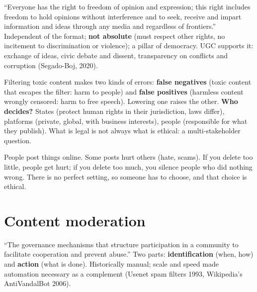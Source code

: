 \documentclass[11pt,a4paper,openany]{book}
\begin{document}
\begin{defnbox}[title={Freedom of expression (UDHR art.\ 19, 1948; ICCPR, 1966)}]
``Everyone has the right to freedom of opinion and expression; this right includes freedom to
hold opinions without interference and to seek, receive and impart information and ideas through
any media and regardless of frontiers.'' Independent of the format; \textbf{not absolute}
(must respect other rights, no incitement to discrimination or violence); a pillar of democracy.
UGC supports it: exchange of ideas, civic debate and dissent, transparency on conflicts and
corruption (Segado-Boj, 2020).
\end{defnbox}

\begin{keybox}[title={The dilemma: free speech vs.\ toxic content}]
Filtering toxic content makes two kinds of errors:
\textbf{false negatives} (toxic content that escapes the filter: harm to people) and
\textbf{false positives} (harmless content wrongly censored: harm to free speech). Lowering one
raises the other. \textbf{Who decides?} States (protect human rights in their jurisdiction,
laws differ), platforms (private, global, with business interests), people (responsible for
what they publish). What is legal is not always what is ethical: a multi-stakeholder question.
\end{keybox}

\begin{goatbox}
People post things online. Some posts hurt others (hate, scams). If you delete too little,
people get hurt; if you delete too much, you silence people who did nothing wrong. There is no
perfect setting, so someone has to choose, and that choice is ethical.
\end{goatbox}


\section{Content moderation}

\begin{defnbox}[title={Content moderation (Grimmelmann, 2015)}]
``The governance mechanisms that structure participation in a community to facilitate
cooperation and prevent abuse.'' Two parts: \textbf{identification} (when, how) and
\textbf{action} (what is done). Historically manual; scale and speed made automation necessary
as a complement (Usenet spam filters 1993, Wikipedia's AntiVandalBot 2006).
\end{defnbox}
\end{document}
